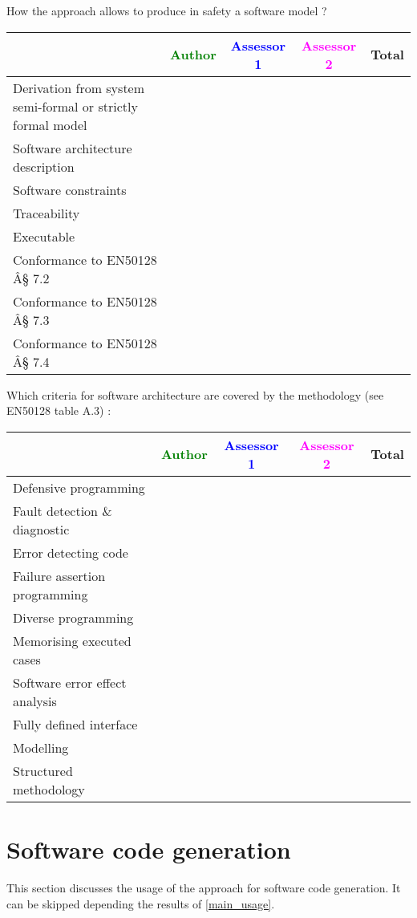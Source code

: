 How the approach allows to  produce in safety a software model ?

\begin{tabular}{|l | c | c | c | c|}
\hline
& \textcolor{green}{Author} & \textcolor{blue}{Assessor 1} & \textcolor{magenta}{Assessor 2} & Total \\
\hline
Derivation from system semi-formal or strictly formal model  & & & &  \\
\hline 
Software architecture description  & & & &  \\
\hline
Software constraints  & & & &  \\
\hline
Traceability  & & & &  \\
\hline
Executable  & & & &  \\
\hline
Conformance to EN50128 Â§ 7.2  & & & &  \\
\hline
Conformance to EN50128 Â§ 7.3  & & & &  \\
\hline
Conformance to EN50128 Â§ 7.4  & & & &  \\
\hline
\end{tabular}

Which criteria for software architecture are covered by the methodology
(see EN50128 table A.3) :

\begin{tabular}{|l | c | c | c | c|}
\hline
& \textcolor{green}{Author} & \textcolor{blue}{Assessor 1} & \textcolor{magenta}{Assessor 2} & Total \\
\hline
Defensive programming  & & & &  \\
\hline 
Fault detection \& diagnostic  & & & &  \\
\hline
Error detecting code  & & & &  \\
\hline
Failure assertion programming & & & &  \\
\hline
Diverse programming & & & &  \\
\hline
Memorising executed cases & & & &  \\
\hline
Software error effect analysis & & & &  \\
\hline
Fully defined interface & & & &  \\
\hline
Modelling  & & & &  \\
\hline
Structured methodology & & & &  \\
\hline
\end{tabular}

\section{Software code generation}
This section discusses the usage of the approach for software code generation.
It can be skipped depending the results of \ref{main_usage}.

